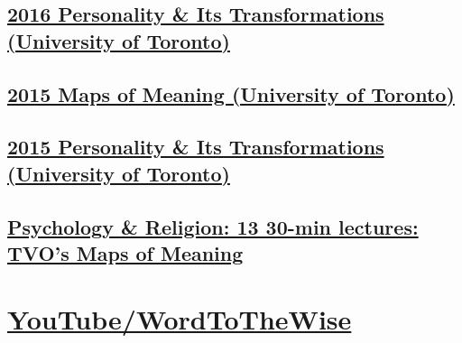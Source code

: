 \documentclass{book}
\numberwithin{equation}{section}
\begin{document}
\section{\href{https://www.youtube.com/playlist?list=PL22J3VaeABQAOhH1CLMNnMl2R-O1abW1T}{2016 Personality \& Its Transformations (University of Toronto)}}

\section{\href{https://www.youtube.com/playlist?list=PL22J3VaeABQByVcW4lXQ46glULC-ekhOp}{2015 Maps of Meaning (University of Toronto)}}

\section{\href{https://www.youtube.com/playlist?list=PL22J3VaeABQAhrMCQUa6sde_Y9DVbLYRv}{2015 Personality \& Its Transformations (University of Toronto)}}

\section{\href{https://www.youtube.com/playlist?list=PL22J3VaeABQC6oShltYc6rMUDAGJ7_G5e}{Psychology \& Religion: 13 30-min lectures: TVO's Maps of Meaning}}



\chapter{\href{https://www.youtube.com/channel/UCLb_x8TboHIoO0F7uYSl4Ww}{YouTube/WordToTheWise}}
\end{document}
